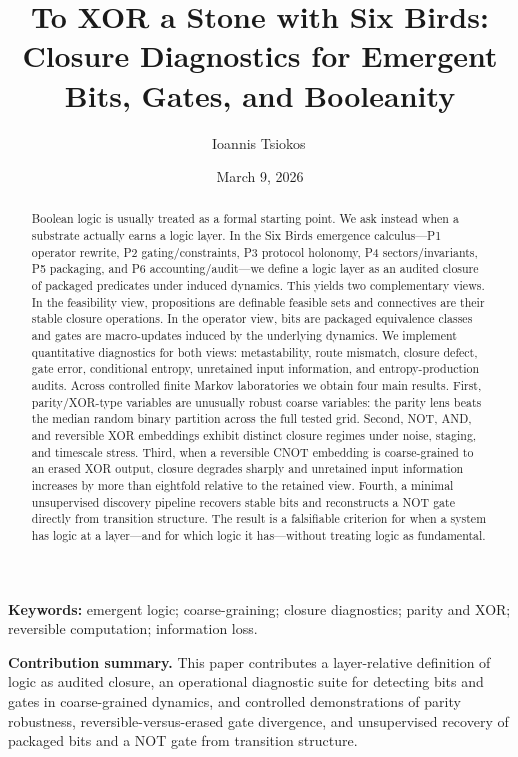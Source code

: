 \documentclass[11pt]{article}
\title{To XOR a Stone with Six Birds: Closure Diagnostics for Emergent Bits, Gates, and Booleanity}
\author{Ioannis Tsiokos\,\orcidlink{0009-0009-7659-5964}}
\date{March 9, 2026}
\theoremstyle{definition}
\begin{document}
\maketitle
\thispagestyle{firstpage}

\begin{abstract}
Boolean logic is usually treated as a formal starting point. We ask instead when a substrate actually earns a logic layer. In the Six Birds emergence calculus---P1 operator rewrite, P2 gating/constraints, P3 protocol holonomy, P4 sectors/invariants, P5 packaging, and P6 accounting/audit---we define a logic layer as an audited closure of packaged predicates under induced dynamics. This yields two complementary views. In the feasibility view, propositions are definable feasible sets and connectives are their stable closure operations. In the operator view, bits are packaged equivalence classes and gates are macro-updates induced by the underlying dynamics. We implement quantitative diagnostics for both views: metastability, route mismatch, closure defect, gate error, conditional entropy, unretained input information, and entropy-production audits. Across controlled finite Markov laboratories we obtain four main results. First, parity/XOR-type variables are unusually robust coarse variables: the parity lens beats the median random binary partition across the full tested grid. Second, NOT, AND, and reversible XOR embeddings exhibit distinct closure regimes under noise, staging, and timescale stress. Third, when a reversible CNOT embedding is coarse-grained to an erased XOR output, closure degrades sharply and unretained input information increases by more than eightfold relative to the retained view. Fourth, a minimal unsupervised discovery pipeline recovers stable bits and reconstructs a NOT gate directly from transition structure. The result is a falsifiable criterion for when a system has logic at a layer---and for which logic it has---without treating logic as fundamental.
\end{abstract}

\noindent\textbf{Keywords:} emergent logic; coarse-graining; closure diagnostics; parity and XOR; reversible computation; information loss.

\medskip

\noindent\textbf{Contribution summary.} This paper contributes a layer-relative definition of logic as audited closure, an operational diagnostic suite for detecting bits and gates in coarse-grained dynamics, and controlled demonstrations of parity robustness, reversible-versus-erased gate divergence, and unsupervised recovery of packaged bits and a NOT gate from transition structure.
 
\end{document}
